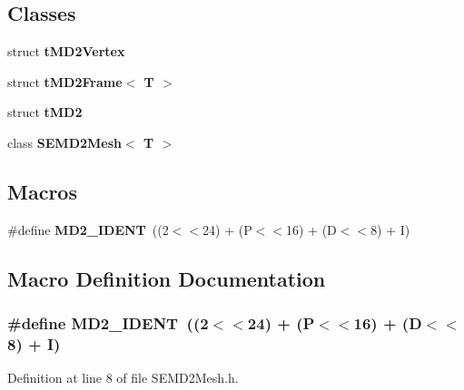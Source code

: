 \subsection*{Classes}
\begin{DoxyCompactItemize}
\item 
struct {\bf t\+M\+D2\+Vertex}
\item 
struct {\bf t\+M\+D2\+Frame$<$ T $>$}
\item 
struct {\bf t\+M\+D2}
\item 
class {\bf S\+E\+M\+D2\+Mesh$<$ T $>$}
\end{DoxyCompactItemize}
\subsection*{Macros}
\begin{DoxyCompactItemize}
\item 
\#define {\bf M\+D2\+\_\+\+I\+D\+E\+N\+T}~((\textquotesingle{}2\textquotesingle{}$<$$<$24) + (\textquotesingle{}P\textquotesingle{}$<$$<$16) + (\textquotesingle{}D\textquotesingle{}$<$$<$8) + \textquotesingle{}I\textquotesingle{})
\end{DoxyCompactItemize}


\subsection{Macro Definition Documentation}
\subsubsection[{M\+D2\+\_\+\+I\+D\+E\+N\+T}]{\setlength{\rightskip}{0pt plus 5cm}\#define M\+D2\+\_\+\+I\+D\+E\+N\+T~((\textquotesingle{}2\textquotesingle{}$<$$<$24) + (\textquotesingle{}P\textquotesingle{}$<$$<$16) + (\textquotesingle{}D\textquotesingle{}$<$$<$8) + \textquotesingle{}I\textquotesingle{})}\label{_s_e_m_d2_mesh_8h_a8dd705747c8886a7da19683995e852d5}


Definition at line 8 of file S\+E\+M\+D2\+Mesh.\+h.

